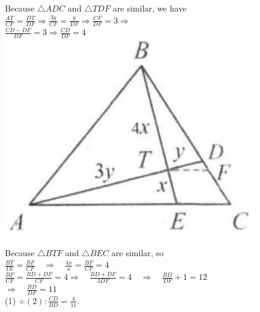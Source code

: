 \documentclass{article}
\begin{document}
Because \(\triangle A D C\) and \(\triangle T D F\) are similar, we have\\
\(\frac{A T}{C F}=\frac{D T}{D F} \Rightarrow \frac{3 y}{C F}=\frac{y}{D F} \Rightarrow \frac{C F}{D F}=3 \Rightarrow\)\\
\(\frac{C D-D F}{D F}=3 \Rightarrow \frac{C D}{D F}=4\)\\
\centering
\includegraphics[width=\textwidth]{images/105.jpg}

Because \(\triangle B T F\) and \(\triangle B E C\) are similar, so\\
\(\frac{B T}{T E}=\frac{B F}{C F} \quad \Rightarrow \quad \frac{4 x}{x}=\frac{B F}{C F}=4\)\\
\(\frac{B F}{C F}=\frac{B D+D F}{C F}=4 \Rightarrow \quad \frac{B D+D F}{3 D F}=4 \quad \Rightarrow \quad \frac{B D}{D F}+1=12\)\\
\(\Rightarrow \quad \frac{B D}{D F}=11\)\\
(1) \(\div(2): \frac{C D}{B D}=\frac{4}{11}\).
\end{document}
